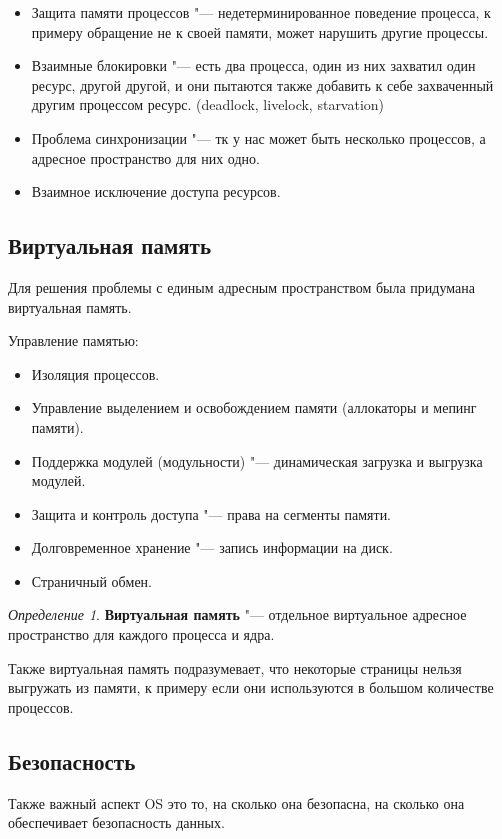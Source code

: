 \documentclass[bachelor, och, book]{SCWorks}
\theoremstyle{remark}
\newtheorem{definition}{Определение}
\begin{document}
    \begin{itemize}[label=$\bullet$]
        \item Защита памяти процессов "--- недетерминированное поведение процесса, к примеру обращение не к своей памяти, может нарушить другие процессы.
        \item Взаимные блокировки "--- есть два процесса, один из них захватил один ресурс, другой другой, и они пытаются также добавить к себе захваченный другим процессом ресурс. (deadlock, livelock, starvation)
        \item Проблема синхронизации "--- тк у нас может быть несколько процессов, а адресное пространство для них одно.
        \item Взаимное исключение доступа ресурсов.
    \end{itemize}

    \subsection{Виртуальная память}
    Для решения проблемы с единым адресным пространством была придумана виртуальная память.

    Управление памятью: 
    \begin{itemize}[label=$\bullet$]
        \item Изоляция процессов.
        \item Управление выделением и освобождением памяти (аллокаторы и мепинг памяти).
        \item Поддержка модулей (модульности) "--- динамическая загрузка и выгрузка модулей.
        \item Защита и контроль доступа "--- права на сегменты памяти.
        \item Долговременное хранение "--- запись информации на диск.
        \item Страничный обмен. 
    \end{itemize}

    \begin{definition}
        \textbf{Виртуальная память} "--- отдельное виртуальное адресное пространство для каждого процесса и ядра.
    \end{definition}

    Также виртуальная память подразумевает, что некоторые страницы нельзя выгружать из памяти, к примеру если они используются в большом количестве процессов.
    
    \subsection{Безопасность}
    Также важный аспект OS это то, на сколько она безопасна, на сколько она обеспечивает безопасность данных.
\end{document}
